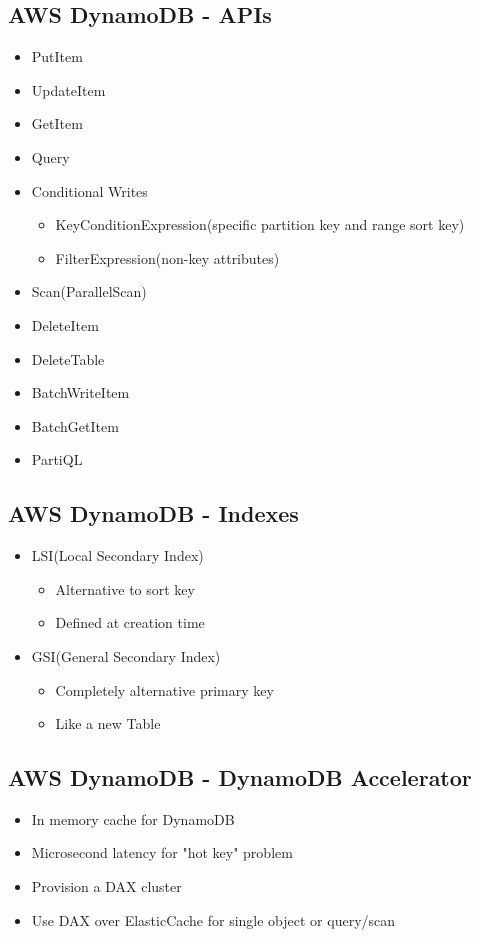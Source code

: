 \documentclass[../main.tex]{subfiles}
\begin{document}
\subsection{AWS DynamoDB - APIs}
\begin{itemize}
    \item PutItem
    \item UpdateItem
    \item GetItem
    \item Query
    \item Conditional Writes
    \begin{itemize}
        \item KeyConditionExpression(specific partition key and range sort key)
        \item FilterExpression(non-key attributes)
    \end{itemize}
    \item Scan(ParallelScan)
    \item DeleteItem
    \item DeleteTable
    \item BatchWriteItem
    \item BatchGetItem
    \item PartiQL
\end{itemize}

\subsection{AWS DynamoDB - Indexes}
\begin{itemize}
    \item LSI(Local Secondary Index)
    \begin{itemize}
        \item Alternative to sort key
        \item Defined at creation time
    \end{itemize}
    \item GSI(General Secondary Index)
    \begin{itemize}
        \item Completely alternative primary key
        \item Like a new Table
    \end{itemize}
\end{itemize}

\subsection{AWS DynamoDB - DynamoDB Accelerator}
\begin{itemize}
    \item In memory cache for DynamoDB
    \item Microsecond latency for "hot key" problem
    \item Provision a DAX cluster
    \item Use DAX over ElasticCache for single object or query/scan
\end{itemize}
\end{document}
